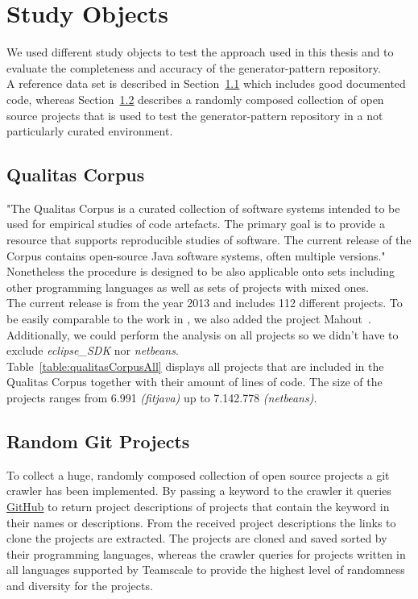 \section{Study Objects}
We used different study objects to test the approach used in this thesis and to evaluate the completeness and accuracy of the generator-pattern repository. \\
A reference data set is described in Section~\ref{section:qualitasCorpus} which includes good documented code, whereas Section~\ref{section:randomGitProjects} describes a randomly composed collection of open source projects that is used to test the generator-pattern repository in a not particularly curated environment.
 
\subsection{Qualitas Corpus}
\label{section:qualitasCorpus}
"The Qualitas Corpus is a curated collection of software systems intended to be used for empirical studies of code artefacts. The primary goal is to provide a resource that supports reproducible studies of software. The current release of the Corpus contains open-source Java software systems, often multiple versions." \cite{TemperoEwanandAnslowCraigandDietrichJensandHanTedandLiJingandLumpeMarkusandMeltonHaydenandNoble2010a}\\
Nonetheless the procedure is designed to be also applicable onto sets including other programming languages as well as sets of projects with mixed ones.\\
The current release is from the year 2013 and includes 112 different projects. To be easily comparable to the work in \cite{Bernwieser2014}, we also added the project Mahout~\cite{ApacheSoftwareFoundation}.\\
Additionally, we could perform the analysis on all projects so we didn't have to exclude \textit{eclipse\_SDK} nor \textit{netbeans}.\\
Table~\ref{table:qualitasCorpusAll} displays all projects that are included in the Qualitas Corpus together with their amount of lines of code. The size of the projects ranges from 6.991 \textit{(fitjava)} up to 7.142.778 \textit{(netbeans)}.


\subsection{Random Git Projects}
\label{section:randomGitProjects}
To collect a huge, randomly composed collection of open source projects a git crawler has been implemented.
By passing a keyword to the crawler it queries \href{github.com}{GitHub} to return project descriptions of projects that contain the keyword in their names or descriptions. From the received project descriptions the links to clone the projects are extracted. The projects are cloned and saved sorted by their programming languages, whereas the crawler queries for projects written in all languages supported by Teamscale to provide the highest level of randomness and diversity for the projects.


